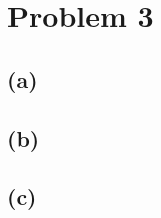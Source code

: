 \documentclass[12pt, a4paper]{article}
\begin{document}
\newpage
\section*{Problem 3}
\subsection*{(a)} 



\subsection*{(b)} 



\subsection*{(c)}
\end{document}
